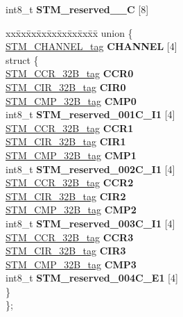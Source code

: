 \begin{DoxyCompactItemize}
\begin{tabbing}
\end{tabbing}\item 
\mbox{\label{structSTM__struct__tag_a548250a1f39ac70e3bfca528fbe7bf02}} 
int8\+\_\+t {\bfseries S\+T\+M\+\_\+reserved\+\_\+\_\+C} \mbox{[}8\mbox{]}
\item 
\mbox{\label{structSTM__struct__tag_ac8ee91b2762c73636014fa4e337aa82c}} 
\begin{tabbing}
xx\=xx\=xx\=xx\=xx\=xx\=xx\=xx\=xx\=\kill
union \{\\
\>\mbox{\hyperlink{structSTM__CHANNEL__struct__tag}{STM\_CHANNEL\_tag}} {\bfseries CHANNEL} \mbox{[}4\mbox{]}\\
\mbox{\label{unionSTM__struct__tag_1_1_0D2194_a170e3074232cdb17eee9f406caa5bee0}} 
\>struct \{\\
\>\>\mbox{\hyperlink{unionSTM__CCR__32B__tag}{STM\_CCR\_32B\_tag}} {\bfseries CCR0}\\
\>\>\mbox{\hyperlink{unionSTM__CIR__32B__tag}{STM\_CIR\_32B\_tag}} {\bfseries CIR0}\\
\>\>\mbox{\hyperlink{unionSTM__CMP__32B__tag}{STM\_CMP\_32B\_tag}} {\bfseries CMP0}\\
\>\>int8\_t {\bfseries STM\_reserved\_001C\_I1} \mbox{[}4\mbox{]}\\
\>\>\mbox{\hyperlink{unionSTM__CCR__32B__tag}{STM\_CCR\_32B\_tag}} {\bfseries CCR1}\\
\>\>\mbox{\hyperlink{unionSTM__CIR__32B__tag}{STM\_CIR\_32B\_tag}} {\bfseries CIR1}\\
\>\>\mbox{\hyperlink{unionSTM__CMP__32B__tag}{STM\_CMP\_32B\_tag}} {\bfseries CMP1}\\
\>\>int8\_t {\bfseries STM\_reserved\_002C\_I1} \mbox{[}4\mbox{]}\\
\>\>\mbox{\hyperlink{unionSTM__CCR__32B__tag}{STM\_CCR\_32B\_tag}} {\bfseries CCR2}\\
\>\>\mbox{\hyperlink{unionSTM__CIR__32B__tag}{STM\_CIR\_32B\_tag}} {\bfseries CIR2}\\
\>\>\mbox{\hyperlink{unionSTM__CMP__32B__tag}{STM\_CMP\_32B\_tag}} {\bfseries CMP2}\\
\>\>int8\_t {\bfseries STM\_reserved\_003C\_I1} \mbox{[}4\mbox{]}\\
\>\>\mbox{\hyperlink{unionSTM__CCR__32B__tag}{STM\_CCR\_32B\_tag}} {\bfseries CCR3}\\
\>\>\mbox{\hyperlink{unionSTM__CIR__32B__tag}{STM\_CIR\_32B\_tag}} {\bfseries CIR3}\\
\>\>\mbox{\hyperlink{unionSTM__CMP__32B__tag}{STM\_CMP\_32B\_tag}} {\bfseries CMP3}\\
\>\>int8\_t {\bfseries STM\_reserved\_004C\_E1} \mbox{[}4\mbox{]}\\
\>\} \\
\}; \\

\end{tabbing}\end{DoxyCompactItemize}


